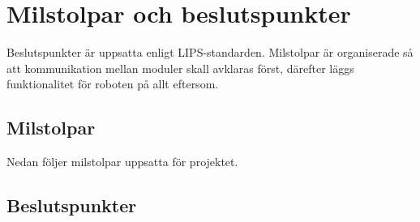 \section{Milstolpar och beslutspunkter}
Beslutspunkter är uppsatta enligt LIPS-standarden. Milstolpar är organiserade så att kommunikation mellan moduler skall avklaras först, därefter läggs funktionalitet för roboten på allt eftersom.

\subsection{Milstolpar}
Nedan följer milstolpar uppsatta för projektet.
\begin{LIPSmilstolpar}
\end{LIPSmilstolpar}

\subsection{Beslutspunkter}
\begin{LIPSmilstolpar}
\end{LIPSmilstolpar}